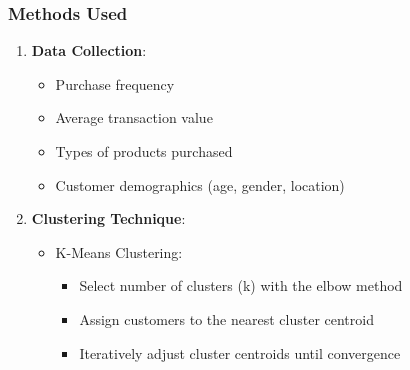 \documentclass[aspectratio=169]{beamer}
\begin{document}
\begin{frame}[fragile]
    \frametitle{Methods Used}
    \begin{enumerate}
        \item \textbf{Data Collection}:
            \begin{itemize}
                \item Purchase frequency
                \item Average transaction value
                \item Types of products purchased
                \item Customer demographics (age, gender, location)
            \end{itemize}
        \item \textbf{Clustering Technique}:
            \begin{itemize}
                \item K-Means Clustering:
                \begin{itemize}
                    \item Select number of clusters (k) with the elbow method
                    \item Assign customers to the nearest cluster centroid
                    \item Iteratively adjust cluster centroids until convergence
                \end{itemize}
            \end{itemize}
    \end{enumerate}
\end{frame}
\end{document}
